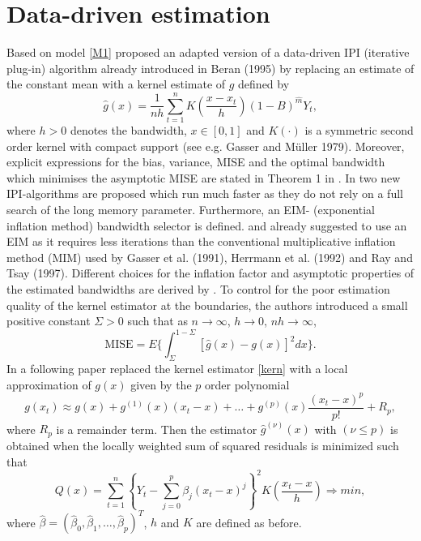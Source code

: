 \documentclass[12pt]{article}
\begin{document}
\section{Data-driven estimation}
\label{kern}Based on model \eqref{M1} \citet{beran2002semifar} proposed an adapted version of a data-driven IPI (iterative plug-in) algorithm already introduced in Beran (1995) by replacing an estimate of the constant mean with a kernel estimate of $g$ defined by
\begin{equation}
\hat{g}(x) = \frac{1}{nh}\sum_{t=1}^{n}K(\frac{x-x_t}{h})(1-B)^{\hat{m}}Y_t,
\end{equation}
where $h>0$ denotes the bandwidth, $x\in[0,1]$ and $K(\cdot)$ is a symmetric second order kernel with compact support (see e.g. Gasser and M\"uller 1979). Moreover, explicit expressions for the bias, variance, MISE and the optimal bandwidth which minimises the asymptotic MISE are stated in Theorem 1 in \citet{beran2002semifar}.
In \citet{beran2002iterative} two new IPI-algorithms are proposed which run much faster as they do not rely on a full search of the long memory parameter. Furthermore, an EIM- (exponential inflation method) bandwidth selector is defined.  \citet{beran2001volatility} and \citet{beran2002semifar} already suggested to use an EIM as it requires less iterations than the conventional multiplicative inflation method (MIM) used by Gasser et al. (1991), Herrmann et al. (1992) and Ray and Tsay (1997). Different choices for the inflation factor and asymptotic properties of the estimated bandwidths are derived by \citet{beran2002iterative}. To control for the poor estimation quality of the kernel estimator at the boundaries, the authors introduced a small positive constant $\Sigma > 0$ such that as $n \rightarrow \infty$, $h\rightarrow 0$, $nh\rightarrow \infty$,
\begin{equation}
\text{MISE} = E \bigg\{  \int_{\Sigma}^{1-\Sigma}[\hat{g}(x)-g(x)]^2dx   \bigg\}.
\end{equation}
In a following paper \citet{beran2002local} replaced the kernel estimator \eqref{kern} with a 
local approximation of \(g(x)\) given by the \(p\) order polynomial
\begin{equation}
\label{lp}
g(x_{t}) \approx g(x) + g^{(1)}(x)(x_{t} - x) + \ldots + g^{(p)}(x)\frac{(x_{t} - x)^{p}}{p!} + R_{p},
\end{equation}
where \(R_{p}\) is a remainder term. Then the estimator \(\hat{g}^{(\nu)}(x)\) with \((\nu \leq p)\) is obtained when the locally weighted sum of squared residuals is minimized such that
\begin{equation}
\label{eq:2.2}
Q(x) = \sum_{t=1}^{n} \left\lbrace Y_{t} - \sum_{j=0}^{p} \beta_{j}(x_{t} - x)^{j} \right\rbrace^{2} K \left( \frac{x_{t} - x}{h} \right) \Rightarrow min ,
\end{equation}
where \(\hat{\beta} = (\hat{\beta}_{0},\hat{\beta}_{1},\ldots,\hat{\beta}_{p})^{T}\), $h$ and $K$ are defined as before.
\end{document}
